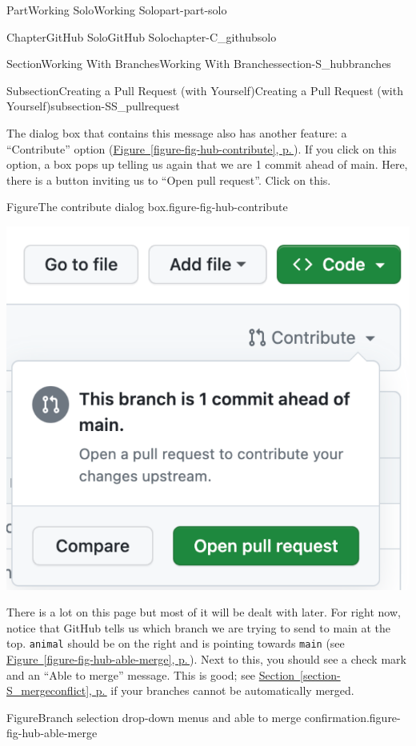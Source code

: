 \documentclass[twoside,10pt,]{book}
\newcommand{\xreffont}{\relax}
\newcommand{\mono}[1]{\texttt{#1}}
\begin{document}
\begin{partptx}{Part}{Working Solo}{}{Working Solo}{}{}{part-part-solo}
\begin{chapterptx}{Chapter}{GitHub Solo}{}{GitHub Solo}{}{}{chapter-C_githubsolo}
\begin{sectionptx}{Section}{Working With Branches}{}{Working With Branches}{}{}{section-S_hubbranches}
\begin{subsectionptx}{Subsection}{Creating a Pull Request (with Yourself)}{}{Creating a Pull Request (with Yourself)}{}{}{subsection-SS_pullrequest}
\par
The dialog box that contains this message also has another feature: a ``Contribute'' option (\hyperref[figure-fig-hub-contribute]{Figure~{\xreffont\ref{figure-fig-hub-contribute}}, p.\,\pageref{figure-fig-hub-contribute}}). If you click on this option, a box pops up telling us again that we are 1 commit ahead of main. Here, there is a button inviting us to ``Open pull request''. Click on this.%
\begin{figureptx}{Figure}{The contribute dialog box.}{figure-fig-hub-contribute}{}%
\begin{image}{0.25}{0.5}{0.25}{}%
\includegraphics[width=\linewidth]{external/hub_contribute.pdf}
\end{image}%
\tcblower
\end{figureptx}%
There is a lot on this page but most of it will be dealt with later. For right now, notice that GitHub tells us which branch we are trying to send to main at the top. \mono{animal} should be on the right and is pointing towards \mono{main} (see \hyperref[figure-fig-hub-able-merge]{Figure~{\xreffont\ref{figure-fig-hub-able-merge}}, p.\,\pageref{figure-fig-hub-able-merge}}). Next to this, you should see a check mark and an ``Able to merge'' message. This is good; see \hyperref[section-S_mergeconflict]{Section~{\xreffont\ref{section-S_mergeconflict}}, p.\,\pageref{section-S_mergeconflict}} if your branches cannot be automatically merged.%
\begin{figureptx}{Figure}{Branch selection drop-down menus and able to merge confirmation.}{figure-fig-hub-able-merge}{}%

\end{figureptx}
\end{subsectionptx}
\end{sectionptx}
\end{chapterptx}
\end{partptx}
\end{document}

